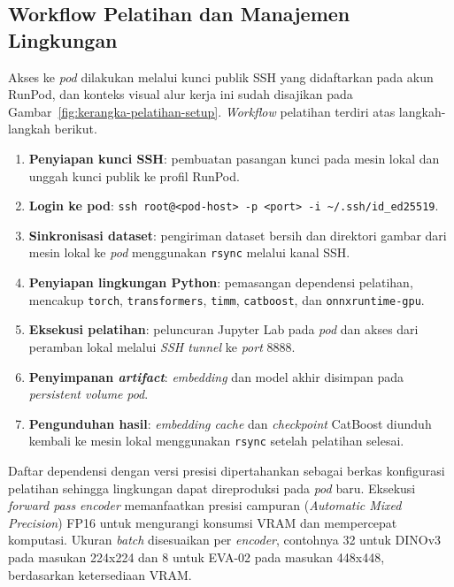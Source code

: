 \subsection{Workflow Pelatihan dan Manajemen Lingkungan}

Akses ke \textit{pod} dilakukan melalui kunci publik SSH yang didaftarkan pada akun RunPod, dan konteks visual alur kerja ini sudah disajikan pada Gambar~\ref{fig:kerangka-pelatihan-setup}. \textit{Workflow} pelatihan terdiri atas langkah-langkah berikut.

\begin{enumerate}
    \item \textbf{Penyiapan kunci SSH}: pembuatan pasangan kunci pada mesin lokal dan unggah kunci publik ke profil RunPod.
    \item \textbf{Login ke pod}: \texttt{ssh root@<pod-host>\allowbreak{} -p <port>\allowbreak{} -i \textasciitilde/.ssh/\allowbreak{}id\_ed25519}.
    \item \textbf{Sinkronisasi dataset}: pengiriman dataset bersih dan direktori gambar dari mesin lokal ke \textit{pod} menggunakan \texttt{rsync} melalui kanal SSH.
    \item \textbf{Penyiapan lingkungan Python}: pemasangan dependensi pelatihan, mencakup \texttt{torch}, \texttt{transformers}, \texttt{timm}, \texttt{catboost}, dan \texttt{onnxruntime-gpu}.
    \item \textbf{Eksekusi pelatihan}: peluncuran Jupyter Lab pada \textit{pod} dan akses dari peramban lokal melalui \textit{SSH tunnel} ke \textit{port} 8888.
    \item \textbf{Penyimpanan \textit{artifact}}: \textit{embedding} dan model akhir disimpan pada \textit{persistent volume} \textit{pod}.
    \item \textbf{Pengunduhan hasil}: \textit{embedding cache} dan \textit{checkpoint} CatBoost diunduh kembali ke mesin lokal menggunakan \texttt{rsync} setelah pelatihan selesai.
\end{enumerate}

Daftar dependensi dengan versi presisi dipertahankan sebagai berkas konfigurasi pelatihan sehingga lingkungan dapat direproduksi pada \textit{pod} baru. Eksekusi \textit{forward pass} \textit{encoder} memanfaatkan presisi campuran (\textit{Automatic Mixed Precision}) FP16 untuk mengurangi konsumsi VRAM dan mempercepat komputasi. Ukuran \textit{batch} disesuaikan per \textit{encoder}, contohnya 32 untuk DINOv3 pada masukan 224x224 dan 8 untuk EVA-02 pada masukan 448x448, berdasarkan ketersediaan VRAM.

